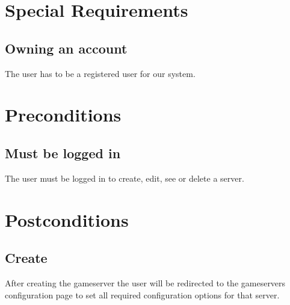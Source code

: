 \documentclass[a4paper,12pt,chapterprefix=false,bibliography=totoc,listof=totoc,book]{scrreprt}
\begin{document}
\chapter{Special Requirements}

\section{Owning an account}
The user has to be a registered user for our system.

\chapter{Preconditions}
\section{Must be logged in}
The user must be logged in to create, edit, see or delete a server.

\chapter{Postconditions}

\section{Create}
After creating the gameserver the user will be redirected to the gameservers configuration page to set all required configuration options for that server.
\end{document}
